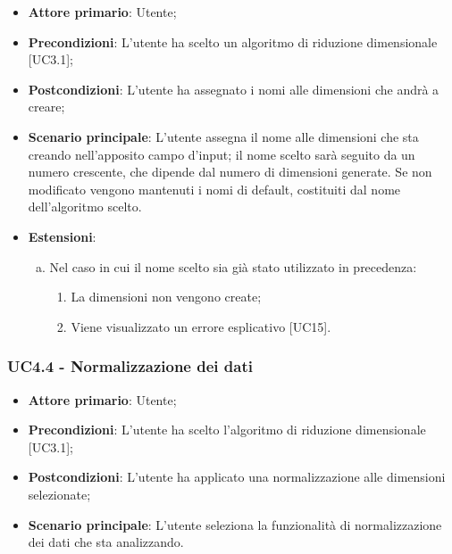 \begin{itemize}
	\item \textbf{Attore primario}: Utente;
	
	\item \textbf{Precondizioni}: L'utente ha scelto un algoritmo di riduzione dimensionale [UC3.1];
	
	\item \textbf{Postcondizioni}: L'utente ha assegnato i nomi alle dimensioni che andrà a creare;
	
	\item \textbf{Scenario principale}: L'utente assegna il nome alle dimensioni che sta creando nell'apposito campo d'input; il nome scelto sarà seguito da un numero crescente, che dipende dal numero di dimensioni generate. Se non modificato vengono mantenuti i nomi di default, costituiti dal nome dell'algoritmo scelto.

\item \textbf{Estensioni}:
	\begin{enumerate}[(a)]
		\item Nel caso in cui il nome scelto sia già stato utilizzato in precedenza:
		\begin{enumerate}[1.]
			\item La dimensioni non vengono create;
			\item Viene visualizzato un errore esplicativo [UC15].
		\end{enumerate}
	\end{enumerate}
\end{itemize}	

\subsubsection{UC4.4 - Normalizzazione dei dati}

\begin{itemize}
	\item \textbf{Attore primario}: Utente;
	
	\item \textbf{Precondizioni}: L'utente ha scelto l'algoritmo di riduzione dimensionale [UC3.1];
	
	\item \textbf{Postcondizioni}: L'utente ha applicato una normalizzazione alle dimensioni selezionate;
	
	\item \textbf{Scenario principale}: L'utente seleziona la funzionalità di normalizzazione dei dati che sta analizzando.
\end{itemize}		
